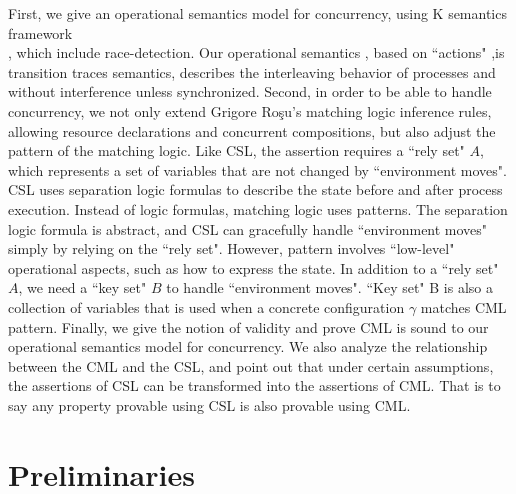 \documentclass{lmcs} %
\theoremstyle{plain}\newtheorem{satz}[thm]{Satz} %
\begin{document}
First, we give an operational semantics model for concurrency, using K semantics framework\\\cite{rosu2010overview}\cite{rosu2017k}, which include race-detection. Our operational semantics , based on ``actions" ,is  transition traces semantics, describes the interleaving behavior of processes and without interference unless synchronized. Second, in order to be able to handle concurrency, we not only extend  Grigore Ro\c{s}u's matching logic inference rules, allowing resource declarations and concurrent compositions, but also adjust the pattern of the matching logic. Like CSL, the assertion requires a ``rely set" $A$, which represents a set of variables that are not changed by ``environment moves". CSL uses separation logic formulas to describe the state before and after process execution. Instead of logic formulas, matching logic uses patterns. The separation logic formula is abstract, and CSL can gracefully handle ``environment moves" simply by relying on the ``rely set". However, pattern involves ``low-level" operational aspects, such as how to express the state. In addition to a ``rely set" $A$, we need  a ``key set" $B$ to handle ``environment moves". ``Key set" B is also a collection of variables that is used when a concrete configuration $\gamma$ matches CML pattern. Finally, we give the notion of validity and prove CML is sound to our operational semantics model for concurrency.  We also analyze the relationship between the CML and the CSL, and point out that under certain assumptions, the assertions of CSL can be transformed into the assertions of CML. That is to say any property provable using CSL is also provable using CML.
\section{Preliminaries}
\end{document}

